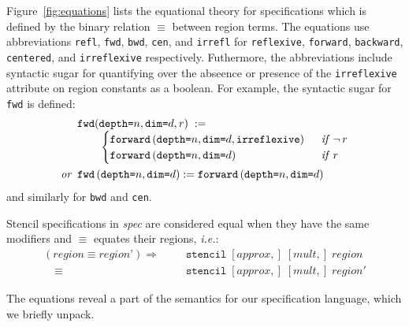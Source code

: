 \documentclass[9pt]{sigplanconf}
\theoremstyle{definition}
\newcommand{\ie}{\emph{i.e.}}
\newcommand{\term}[1]{\texttt{#1}}
\newcommand{\stenFwd}[3]{\term{forward} \, (\term{depth=}#1,
  \term{dim=}#2{#3})}
\newcommand{\irrefl}{\texttt{irreflexive}}
\newcommand{\stenFwdS}[2]{\term{fwd} \, (\term{depth=}#1,
  \term{dim=}#2)}
\newcommand{\irreflS}{\texttt{irrefl}}
\newcommand{\stenFwdSR}[3]{\term{fwd} (\term{depth=}#1,
  \term{dim=}#2, #3)}
\begin{document}
Figure~\ref{fig:equations} lists the equational theory for
specifications which is defined by the binary relation $\equiv$
between region terms. The equations use abbreviations
\term{refl}, \term{fwd}, \term{bwd}, \term{cen}, and \irreflS{}
for \term{reflexive}, \term{forward}, \term{backward},
\term{centered}, and \irrefl{} respectively. Futhermore, the abbreviations include syntactic sugar
for quantifying over the abseence or presence of the \irrefl{}
attribute on region constants as a boolean. For example,
the syntactic sugar for \term{fwd} is defined:
\begin{align*}
\hspace{-0.25em}
& \stenFwdSR{n}{d}{r}
\; := \; \\[-0.4em]
& \qquad \begin{cases}
\stenFwd{n}{d}{, \irrefl} & \;\;\textit{if} \;\, \neg \, r \\
\stenFwd{n}{d}{}  & \;\;\textit{if} \;\,  r
\end{cases} \\
\textit{or} \;\;
& \stenFwdS{n}{d} := \stenFwd{n}{d}{}
\end{align*}
%
and similarly for \term{bwd} and \term{cen}.

Stencil specifications in \textit{spec} are considered
equal when they have the same modifiers and $\equiv$ equates
their regions, \ie{}:
\begin{align*}
(\textit{region} \equiv \textit{region'}) 
 \Rightarrow \quad\;\; & \texttt{stencil} \; [\textit{approx},] \; [\textit{mult},] \;
\textit{region} \\[-0.4em]
\quad \equiv \; & \texttt{stencil} \; [\textit{approx},] \;
            [\textit{mult},] \; \textit{region}'
\end{align*}

The equations reveal a part of the semantics for our
specification language, which we briefly unpack.
\end{document}
